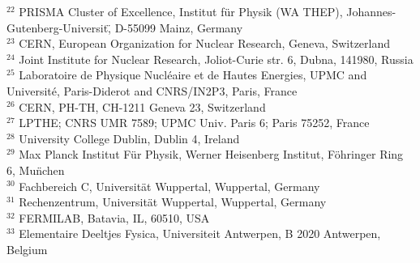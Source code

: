 { $ ^{22}$ PRISMA Cluster of Excellence, Institut für Physik (WA THEP), Johannes-Gutenberg-Universit\", D-55099 Mainz, Germany \\
 $ ^{23}$ CERN, European Organization for Nuclear Research, Geneva, Switzerland \\
 $ ^{24}$ Joint Institute for Nuclear Research, Joliot-Curie str. 6, Dubna, 141980, Russia \\ 
 $ ^{25}$ Laboratoire de Physique Nucl\' eaire et de Hautes Energies, UPMC and Universit\'e, Paris-Diderot and CNRS/IN2P3, Paris, France \\
 $ ^{26}$ CERN, PH-TH, CH-1211 Geneva 23, Switzerland \\
 $ ^{27}$ LPTHE; CNRS UMR 7589; UPMC Univ. Paris 6; Paris 75252, France \\
 $ ^{28}$ University College Dublin, Dublin 4, Ireland \\
 $ ^{29}$ Max Planck Institut F\"ur Physik, Werner Heisenberg Institut, F\"ohringer Ring 6, Mu\"nchen \\
 $ ^{30}$ Fachbereich C, Universit\"at Wuppertal, Wuppertal, Germany \\
 $ ^{31}$ Rechenzentrum, Universit\"at Wuppertal, Wuppertal, Germany \\
 $ ^{32}$ FERMILAB, Batavia, IL, 60510, USA \\
 $ ^{33}$ Elementaire Deeltjes Fysica, Universiteit Antwerpen, B 2020 Antwerpen, Belgium 
}
%
